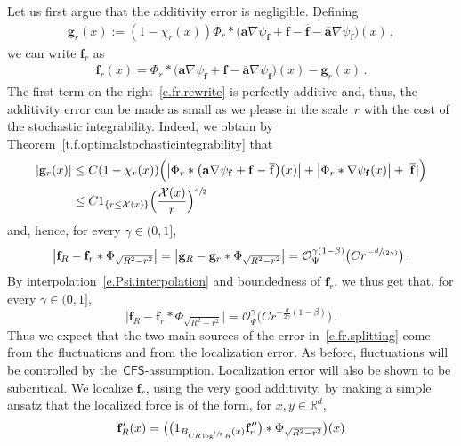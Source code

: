 \documentclass[11pt]{article} %
\numberwithin{equation}{section}
\theoremstyle{definition}
\newcommand*{\R}{\ensuremath{\mathbb{R}}}
\newcommand{\f}{\mathbf{f}}
\newcommand{\g}{\mathbf{g}}
\renewcommand{\a}{\mathbf{a}}
\newcommand{\ahom}{\bar{\a}}
\newcommand{\X}{\mathcal{X}}
\renewcommand{\O}{\mathcal{O}}
\newcommand{\indc}{1}
\newcommand{\CFS}{\mathsf{CFS}}
\begin{document}
\smallskip




Let us first argue that the additivity error is negligible. Defining 
\begin{align*}  
\g_r(x) := (1-\chi_r(x)) \Phi_r \ast  \bigl( \a \nabla \psi_\f + \f - \overline{\f} - \ahom \nabla \psi_\f   \bigr) (x)   \,,
\end{align*}
we can write $\f_r$ as
\begin{align}  \label{e.fr.rewrite}
\f_r(x) = \Phi_r \ast  \bigl( \a \nabla \psi_\f + \f - \ahom \nabla \psi_\f   \bigr) (x)  - \g_r(x)  \,.
\end{align}
The first term on the right~\eqref{e.fr.rewrite} is perfectly additive and, thus, the additivity error can be made as small as we please in the scale~$r$ with the cost of the stochastic integrability. Indeed, we obtain by Theorem~\ref{t.f.optimalstochasticintegrability} that
\begin{align} \notag \label{e.gr.est}
| \g_r(x) | 
& 
\leq 
C(1-\chi_r(x)) \Bigl( \bigl| \Phi_r \ast  \bigl( \a \nabla \psi_\f + \f - \overline{\f}  \bigr)(x)\bigr| + \bigl| \Phi_r \ast  \nabla \psi_\f(x)\bigr|  + | \overline{\f} |  \Bigr)
 \\  &
\leq
C \indc_{\{ r \leq \X(x)\} } \Bigl( \frac{\X(x)}{r} \Bigl)^{\sfrac d2}
\end{align}
and, hence, for every $\gamma \in (0,1]$, 
\begin{align}  \label{e.fr.add}
\big| \f_R - \f_r \ast \Phi_{\sqrt{R^2-r^2}} \big|
=
\big| \g_R - \g_r \ast \Phi_{\sqrt{R^2-r^2}} \big| 
= 
\O_\Psi^{\gamma (1-\beta)} \bigl( C r^{-\sfrac{d}{(2\gamma)}} \bigr)  \,.
\end{align}
By interpolation~\eqref{e.Psi.interpolation} and boundedness of $\f_r$, we thus get that, for every $\gamma \in (0,1]$, 
\begin{equation}  \label{e.fr.additivity}
\big| \f_R - \f_r \ast \Phi_{\sqrt{R^2-r^2}} \big| = \O_\Psi^{\gamma} \bigl( C r^{-\frac{d}{2\gamma}(1-\beta)} \bigr) \,.
\end{equation}
Thus we expect that the two main sources of the error in~\eqref{e.fr.splitting} come from the fluctuations and from the localization error. As before, fluctuations will be controlled by the~$\CFS$-assumption. Localization error will also be shown to be subcritical. We  localize $\f_r$, using the very good additivity, by making a simple ansatz that the localized force is of the form, for $x,y \in \R^d$, 
\begin{equation*}  
\f'_{R}(x)  =  \bigl( \bigl( \indc_{B_{C R \log^{\sfrac12} R }(x)} \f_r'' \bigr) \ast  \Phi_{\sqrt{R^2-r^2}} \bigr) (x)
\end{equation*}
\end{document}
